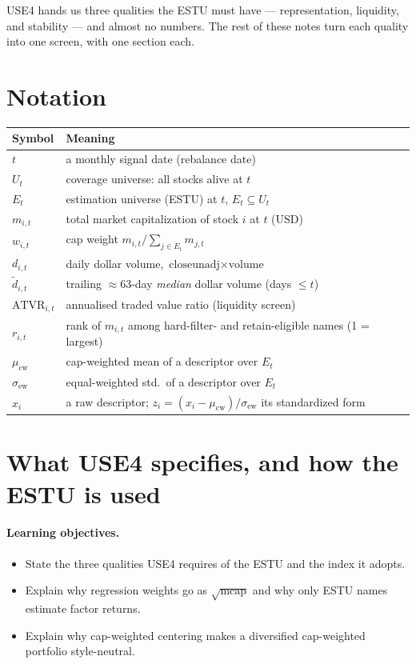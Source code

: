 \documentclass[11pt]{article}
\theoremstyle{definition}
\theoremstyle{plain}
\theoremstyle{remark}
\begin{document}
USE4 hands us three qualities the ESTU must have --- representation, liquidity, and stability --- and almost no numbers. The rest of these notes turn each quality into one screen, with one section each.

\section*{Notation}

\begin{center}
\small
\begin{tabular}{@{}ll@{}}
\toprule
Symbol & Meaning \\
\midrule
$t$ & a monthly signal date (rebalance date) \\
$U_t$ & coverage universe: all stocks alive at $t$ \\
$E_t$ & estimation universe (ESTU) at $t$, $E_t \subseteq U_t$ \\
$m_{i,t}$ & total market capitalization of stock $i$ at $t$ (USD) \\
$w_{i,t}$ & cap weight $m_{i,t}/\sum_{j\in E_t} m_{j,t}$ \\
$d_{i,t}$ & daily dollar volume, $\text{closeunadj}\times\text{volume}$ \\
$\widetilde d_{i,t}$ & trailing $\approx$63-day \emph{median} dollar volume (days $\le t$) \\
$\text{ATVR}_{i,t}$ & annualised traded value ratio (liquidity screen) \\
$r_{i,t}$ & rank of $m_{i,t}$ among hard-filter- and retain-eligible names (1 = largest) \\
$\mu_{\text{cw}}$ & cap-weighted mean of a descriptor over $E_t$ \\
$\sigma_{\text{ew}}$ & equal-weighted std.\ of a descriptor over $E_t$ \\
$x_i$ & a raw descriptor; $z_i=(x_i-\mu_{\text{cw}})/\sigma_{\text{ew}}$ its standardized form \\
\bottomrule
\end{tabular}
\end{center}

\section{What USE4 specifies, and how the ESTU is used}\label{sec:spec}

\paragraph{Learning objectives.}
\begin{itemize}[nosep,leftmargin=1.4em]
  \item State the three qualities USE4 requires of the ESTU and the index it adopts.
  \item Explain why regression weights go as $\sqrt{\text{mcap}}$ and why only ESTU names estimate factor returns.
  \item Explain why cap-weighted centering makes a diversified cap-weighted portfolio style-neutral.
\end{itemize}
\end{document}
